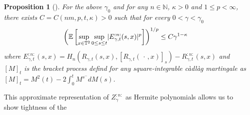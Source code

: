 \documentclass{report}
\newcommand{\NN}{\mathbb{N}}
\newcommand{\TT}{\mathbb{T}}
\DeclarePairedDelimiter\abs{\lvert}{\rvert} %
\newcommand{\Exp}[1]{\mathbb{E}\left[#1\right]}
\newcommand{\Placeholder}{\,\mathrel{\cdot}\,}
\newcommand{\Bracket}[1]{\left[#1\right]}
\newtheorem{proposition}[theorem]{Proposition}
\theoremstyle{remark}
\theoremstyle{definition}
\let\epsilon\varepsilon
\begin{document}
\begin{proposition}[{\cite[Proposition 5.3]{mourrat2015convergencetwodimensionaldynamicisingkac}}]
  For the above $\gamma_0$ and for any $n\in\NN$, $\kappa >0$ and $1 \le p < \infty$, there exists $C = C(nm, p, t, \kappa) > 0$ such that for every $0 < \gamma < \gamma_0$\,
  \begin{align*}
    \left(\Exp{\sup_{x \in \TT^2} \sup_{0 \le s \le t} \abs{E^{:n:}_{\gamma, t}(s, x)}^p}\right)^{1/p} \le C \gamma^{1 - \kappa}\,
  \end{align*}
  where $E^{:n:}_{\gamma, t}(s, x) = H_n(R_{\gamma, t}(s, x), \Bracket{R_{\gamma, t}(\Placeholder, x)}_s) - R^{:n:}_{\gamma, t}(s, x)$ and $\Bracket{M}_t$ is the bracket process defind for any square-integrable càdlàg martingale as $\Bracket{M}_t = M^2(t) - 2 \int_{0}^{t}M^{s^{-}} dM(s)$.
\end{proposition}
This approximate representation of $Z_\gamma^{:n:}$ as Hermite polynomials allows us to show tightness of the 
\end{document}
